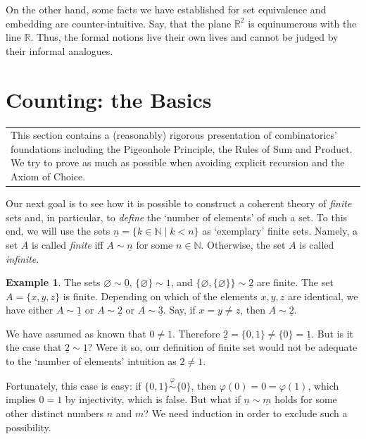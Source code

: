 \documentclass[12pt,notitlepage]{article}
\theoremstyle{plain}
\theoremstyle{definition}
\newtheorem{exm}[thm]{Example}
\theoremstyle{plain}
\newcommand{\N}{\mathbb{N}}
\newcommand{\R}{\mathbb{R}}
\newcommand{\void}{\varnothing}
\renewcommand{\phi}{\varphi}
\newcommand{\ul}[1]{\underline{#1}}
\newcommand{\1}{\mathbf{1}}
\newcommand{\0}{\mathbf{0}}
\newcommand{\mcomm}[1]{
\medskip\noindent\begin{tabular}{| l}
\parbox{0.99\textwidth}{{\small
#1 }}\end{tabular}
\smallskip}
\begin{document}
On the other hand, some facts we have established for set equivalence and embedding are counter-intuitive. Say, that the plane $\R^2$ is equinumerous with the line $\R$. Thus, the formal notions live their own lives and cannot be judged by their informal analogues.

\newpage
\section{Counting: the Basics}\label{sect:comb1}
\mcomm{This section contains a (reasonably) rigorous presentation of combinatorics' foundations including the Pigeonhole Principle, the Rules of Sum and Product. We try to prove as much as possible when avoiding explicit recursion and the Axiom of Choice.}

Our next goal is to see how it is possible to construct a coherent theory of \emph{finite} sets and, in particular, to \emph{define} the `number of elements' of such a set. To this end, we will use the sets $\ul{n} = \{k \in \N \mid k < n \}$ as `exemplary' finite sets. Namely, a set $A$ is called \emph{finite} iff $A \sim \ul{n}$ for some $n \in \N$. Otherwise, the set $A$ is called \emph{infinite}.

\begin{exm}
The sets $\void \sim \ul{0}$, $\{\void\} \sim \ul{1}$, and $\{\void, \{\void\}\} \sim \ul{2}$ are finite. The set $A = \{x,y,z\}$ is finite. Depending on which of the elements $x,y,z$ are identical, we have either $A \sim \ul{1}$ or $A \sim \ul{2}$ or $A \sim \ul{3}$. Say, if $x = y \neq z$, then $A \sim \ul{2}$.
\end{exm}

We have assumed as known that $0 \neq 1$. Therefore $\ul{2} = \{0,1\} \neq \{0\} = \ul{1}$. But is it the case that $\ul{2} \sim \ul{1}$? Were it so, our definition of finite set would not be adequate to the `number of elements' intuition as $2 \neq 1$.

Fortunately, this case is easy: if $\{0,1\} \stackrel{\phi}{\sim} \{0\}$, then $\phi(0) = 0 = \phi(1)$, which implies $0 = 1$ by injectivity, which is false. But what if $\ul{n} \sim \ul{m}$ holds for some other distinct numbers $n$ and $m$? We need induction in order to exclude such a possibility.
\end{document}
